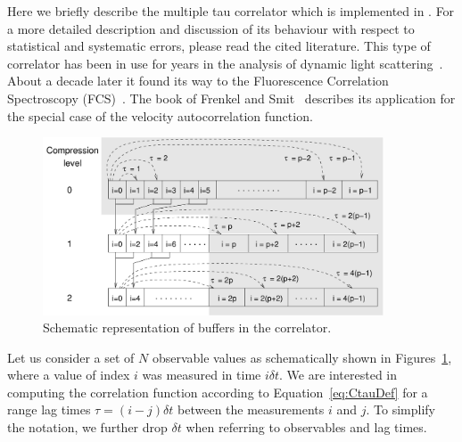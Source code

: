 Here we briefly describe the multiple tau correlator which is implemented in \es.
For a more detailed description and discussion of its behaviour with respect to
statistical and systematic errors, please read the cited literature.
This type of correlator has been in use for years in the analysis of
dynamic light scattering~\cite{schatzel88a}. About a decade later it found its way
to the Fluorescence Correlation Spectroscopy (FCS)~\cite{magatti01a}.
The book of Frenkel and Smit~\cite{frenkel02b} describes its application
for the special case of the velocity autocorrelation function.

\begin{figure}[ht]
\begin{center} 
\includegraphics[width=0.9\textwidth]{figures/correlator_scheme}
\end{center} 
\caption{Schematic representation of buffers in the correlator.}
\label{fig:dataSet}
\end{figure}

Let us consider a set of $N$ observable values as schematically shown
in Figures~\ref{fig:dataSet}, where a value of index $i$ was measured
in time $i\delta t$. We are interested in computing the correlation 
function according to Equation~\ref{eq:CtauDef} for a range lag times
$\tau = (i-j)\delta t$ between the measurements $i$ and $j$.
To simplify the notation, we further drop $\delta t$
when referring to observables and lag times. 

